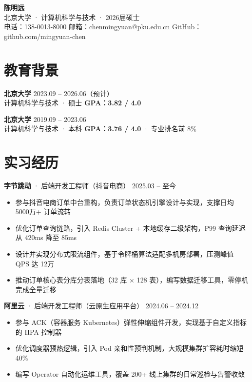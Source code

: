 \documentclass[11pt,a4paper]{article}
\newcommand{\resumeItem}[1]{\item[\textbullet] #1}
\begin{document}
\begin{center}
{\LARGE\bfseries\color{mainblue} 陈明远} \\[4pt]
{\small 北京大学 · 计算机科学与技术 · 2026届硕士} \\[2pt]
{\small 电话：138-0013-8000 \quad 邮箱：chenmingyuan@pku.edu.cn \quad GitHub：github.com/mingyuan-chen}
\end{center}

\vspace{4pt}

\section{教育背景}
\textbf{北京大学} \hfill 2023.09 -- 2026.06（预计）\\
计算机科学与技术 · 硕士 \hfill \textbf{GPA：3.82 / 4.0}

\textbf{北京大学} \hfill 2019.09 -- 2023.06\\
计算机科学与技术 · 本科 \hfill \textbf{GPA：3.76 / 4.0} · 专业排名前 8\%

\section{实习经历}

\textbf{字节跳动} · 后端开发工程师（抖音电商） \hfill 2025.03 -- 至今
\begin{itemize}[leftmargin=1.2em,itemsep=1pt,topsep=2pt]
\resumeItem{参与抖音电商订单中台重构，负责订单状态机引擎设计与实现，支撑日均 5000万+ 订单流转}
\resumeItem{优化订单查询链路，引入 Redis Cluster + 本地缓存二级架构，P99 查询延迟从 420ms 降至 85ms}
\resumeItem{设计并实现分布式限流组件，基于令牌桶算法适配多机房部署，压测峰值 QPS 达 12万}
\resumeItem{推动订单核心表分库分表落地（32 库 × 128 表），编写数据迁移工具，零停机完成全量迁移}
\end{itemize}

\textbf{阿里云} · 后端开发工程师（云原生应用平台） \hfill 2024.06 -- 2024.12
\begin{itemize}[leftmargin=1.2em,itemsep=1pt,topsep=2pt]
\resumeItem{参与 ACK（容器服务 Kubernetes）弹性伸缩组件开发，实现基于自定义指标的 HPA 控制器}
\resumeItem{优化调度器预热逻辑，引入 Pod 亲和性预判机制，大规模集群扩容耗时缩短 40\%}
\resumeItem{编写 Operator 自动化运维工具，覆盖 200+ 线上集群的日常巡检与告警收敛}
\end{itemize}
\end{document}
